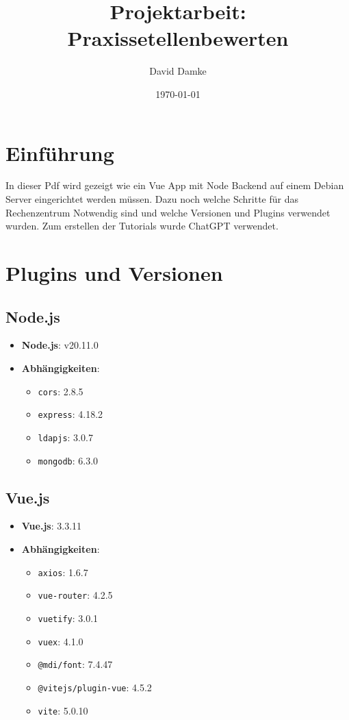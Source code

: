 \documentclass[a4paper,12pt]{article}
\begin{document}
\title{Projektarbeit: Praxissetellenbewerten}
\author{David Damke}
\date{\today}

\maketitle

\tableofcontents
\newpage

\section{Einführung}
In dieser Pdf wird gezeigt wie ein Vue App mit Node Backend auf einem Debian Server eingerichtet werden müssen. 
Dazu noch welche Schritte für das Rechenzentrum Notwendig sind und welche Versionen und Plugins verwendet wurden.
Zum erstellen der Tutorials wurde ChatGPT verwendet. 


\section{Plugins und Versionen}

\subsection{Node.js}
\begin{itemize}
    \item \textbf{Node.js}: v20.11.0
    \item \textbf{Abhängigkeiten}:
    \begin{itemize}
        \item \texttt{cors}: 2.8.5
        \item \texttt{express}: 4.18.2
        \item \texttt{ldapjs}: 3.0.7
        \item \texttt{mongodb}: 6.3.0
    \end{itemize}
\end{itemize}

\subsection{Vue.js}
\begin{itemize}
    \item \textbf{Vue.js}: 3.3.11
    \item \textbf{Abhängigkeiten}:
    \begin{itemize}
        \item \texttt{axios}: 1.6.7
        \item \texttt{vue-router}: 4.2.5
        \item \texttt{vuetify}: 3.0.1
        \item \texttt{vuex}: 4.1.0
        \item \texttt{@mdi/font}: 7.4.47
        \item \texttt{@vitejs/plugin-vue}: 4.5.2
        \item \texttt{vite}: 5.0.10
    \end{itemize}
\end{itemize}
\end{document}

